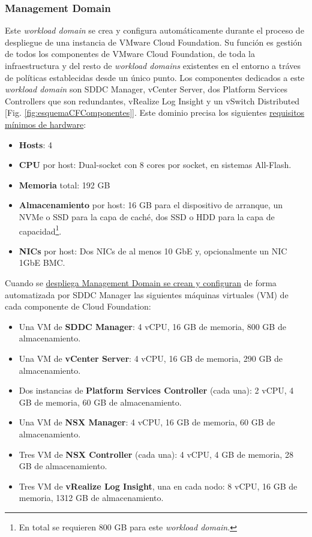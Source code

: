 \subsubsection{Management Domain}
\label{subsubsec:domainManagement}
Este \textit{workload domain} se crea y configura automáticamente durante el proceso de despliegue de una instancia de VMware Cloud Foundation. Su función es gestión de todos los componentes de VMware Cloud Foundation, de toda la infraestructura y del resto de \textit{workload domains} existentes en el entorno a tráves de políticas establecidas desde un único punto. Los componentes dedicados a este \textit{workload domain} son SDDC Manager, vCenter Server, dos Platform Services Controllers que son redundantes, vRealize Log Insight y un vSwitch Distributed [Fig. \ref{fig:esquemaCFComponentes}]. Este dominio precisa los siguientes \underline{requisitos mínimos de hardware}:
\begin{itemize}
    \item \textbf{Hosts}: 4
    \item \textbf{CPU} por host: Dual-socket con 8 cores por socket, en sistemas All-Flash.
    \item \textbf{Memoria} total: 192 GB
    \item \textbf{Almacenamiento} por host: 16 GB para el dispositivo de arranque, un NVMe o SSD para la capa de caché, dos SSD o HDD para la capa de capacidad\footnote{En total se requieren 800 GB para este \textit{workload domain}.}.
    \item \textbf{NICs} por host: Dos NICs de al menos 10 GbE y, opcionalmente un NIC 1GbE BMC.
\end{itemize}

Cuando se \underline{despliega Management Domain se crean y configuran} de forma automatizada por SDDC Manager las siguientes máquinas virtuales (VM) de cada componente de Cloud Foundation:
\begin{itemize}
    \item Una VM de \textbf{SDDC Manager}: 4 vCPU, 16 GB de memoria, 800 GB de almacenamiento.
    \item Una VM de \textbf{vCenter Server}: 4 vCPU, 16 GB de memoria, 290 GB de almacenamiento.
    \item Dos instancias de \textbf{Platform Services Controller} (cada una): 2 vCPU, 4 GB de memoria, 60 GB de almacenamiento.
    \item Una VM de \textbf{NSX Manager}: 4 vCPU, 16 GB de memoria, 60 GB de almacenamiento.
    \item Tres VM de \textbf{NSX Controller} (cada una): 4 vCPU, 4 GB de memoria, 28 GB de almacenamiento.
    \item Tres VM de \textbf{vRealize Log Insight}, una en cada nodo: 8 vCPU, 16 GB de memoria, 1312 GB de almacenamiento.
\end{itemize}


